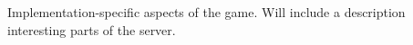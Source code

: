 Implementation-specific aspects of the game. Will include a description interesting parts of the server.